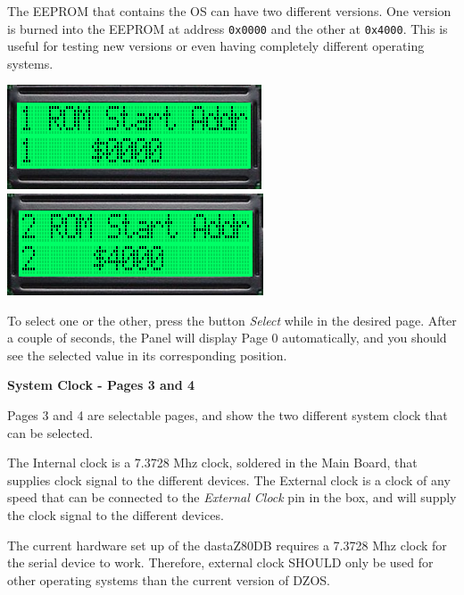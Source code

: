         The EEPROM that contains the OS can have two different versions. One
        version is burned into the EEPROM at address \texttt{0x0000} and the
        other at \texttt{0x4000}. This is useful for testing new versions or
        even having completely different operating systems.

        \begin{center}
            \includegraphics[scale=0.7]{images/dastaZ80_ControlPanel_Page1.png}
            \includegraphics[scale=0.7]{images/dastaZ80_ControlPanel_Page2.png}
        \end{center}

        To select one or the other, press the button \textit{Select} while in
        the desired page. After a couple of seconds, the Panel will display Page
        0 automatically, and you should see the selected value in its
        corresponding position.

        \textbf{System Clock - Pages 3 and 4}

        Pages 3 and 4 are selectable pages, and show the two different system
        clock that can be selected.

        The Internal clock is a 7.3728 Mhz clock, soldered in the Main Board,
        that supplies clock signal to the different devices. The External clock
        is a clock of any speed that can be connected to the
        \textit{External Clock} pin in the box, and will supply the clock signal
        to the different devices.

        The current hardware set up of the dastaZ80DB requires a 7.3728 Mhz
        clock for the serial device to work. Therefore, external clock SHOULD
        only be used for other operating systems than the current version of 
        DZOS.

